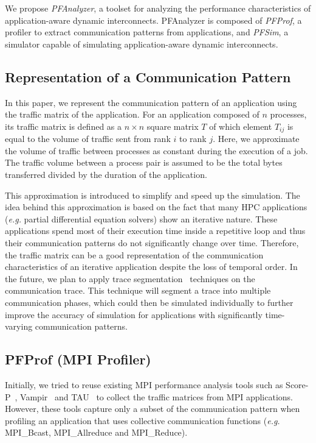 We propose \emph{PFAnalyzer}, a toolset for analyzing the performance
characteristics of application-aware dynamic interconnects. PFAnalyzer
is composed of \emph{PFProf}, a profiler to extract communication
patterns from applications, and \emph{PFSim}, a simulator capable of
simulating application-aware dynamic interconnects.

\subsection{Representation of a Communication Pattern}

In this paper, we represent the communication pattern of an application
using the traffic matrix of the application. For an application composed
of \(n\) processes, its traffic matrix is defined as a \(n \times n\)
square matrix \(T\) of which element \(T_{ij}\) is equal to the volume
of traffic sent from rank \(i\) to rank \(j\). Here, we approximate the
volume of traffic between processes as constant during the execution of
a job. The traffic volume between a process pair is assumed to be the
total bytes transferred divided by the duration of the application.

This approximation is introduced to simplify and speed up the
simulation. The idea behind this approximation is based on the fact that
many HPC applications (\emph{e.g.} partial differential equation
solvers) show an iterative nature. These applications spend most of
their execution time inside a repetitive loop and thus their
communication patterns do not significantly change over time. Therefore,
the traffic matrix can be a good representation of the communication
characteristics of an iterative application despite the loss of temporal
order. In the future, we plan to apply trace
segmentation~\autocite{Alawneh2016} techniques on the communication
trace. This technique will segment a trace into multiple communication
phases, which could then be simulated individually to further improve
the accuracy of simulation for applications with significantly
time-varying communication patterns.

\subsection{PFProf (MPI Profiler)}\label{sec:ii-pfprof}

Initially, we tried to reuse existing MPI performance analysis tools
such as \mbox{Score-P}~\autocite{Knupfer2012},
Vampir~\autocite{Knupfer2008} and TAU~\autocite{Shende2006} to collect
the traffic matrices from MPI applications. However, these tools capture
only a subset of the communication pattern when profiling an application
that uses collective communication functions (\emph{e.g.} MPI\_Bcast,
MPI\_Allreduce and MPI\_Reduce).

